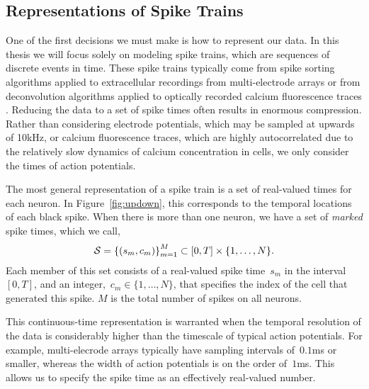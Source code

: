 \subsection{Representations of Spike Trains}
One of the first decisions we must make is how to
represent our data. In this thesis we will focus solely on modeling
spike trains, which are sequences of discrete events in time. These
spike trains typically come from spike sorting algorithms applied to
extracellular recordings from multi-electrode arrays
\citep{lewicki1998review} or from
deconvolution algorithms applied to optically recorded calcium
fluorescence traces \citep{pnevmatikakis2016simultaneous,
  vogelstein2010fast}. Reducing the data to a set of spike times often 
results in enormous compression. Rather than considering electrode 
potentials, which may be sampled at upwards of 10kHz, or calcium 
fluorescence traces, which are highly autocorrelated due to the relatively 
slow dynamics of calcium concentration in cells, we only consider 
the times of action potentials.


The most general representation 
of a spike train is a set of real-valued times for each neuron.
In Figure~\ref{fig:updown}, this corresponds to the temporal locations of
each black spike.
When there is more than one neuron, we have a set of
\emph{marked} spike times, which we call,
\begin{align*}
  \mathcal{S} = \left \{ (s_m, c_m) \right \}_{m=1}^M \subset [0, T] \times \{1, \ldots, N\}.
\end{align*}
Each member of this set consists of a real-valued spike time~$s_m$ in
the interval~$[0, T]$, and an integer,~$c_m \in \{1, \ldots, N\}$,
that specifies the index of the cell that generated this spike. $M$ is 
the total number of spikes on all neurons.

This continuous-time representation is
warranted when the temporal resolution of the data is considerably
higher than the timescale of typical action potentials. For example,
multi-elecrode arrays typically have sampling intervals of~$0.1$ms or
smaller, whereas the width of action potentials is on the order
of~$1$ms. This allows us to specify the spike time as an effectively
real-valued number.  


